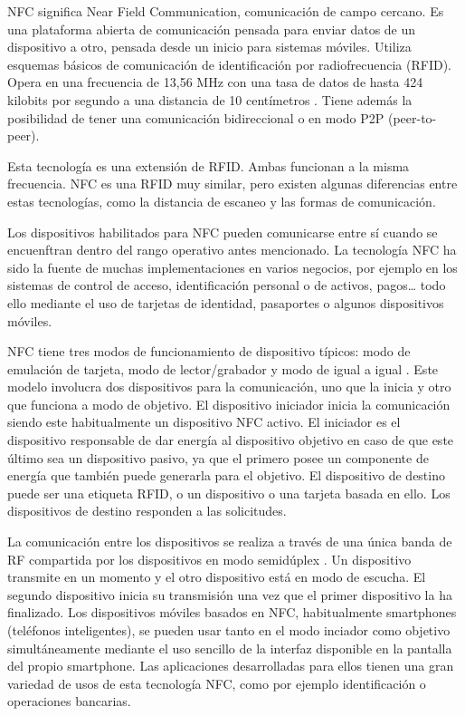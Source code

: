 \documentclass[12pt,a4paper,onecolumn,oneside]{report}
\begin{document}
NFC significa Near Field Communication, comunicación de campo cercano. Es una plataforma abierta de comunicación pensada para enviar datos de un dispositivo a otro, pensada desde un inicio para sistemas móviles. Utiliza esquemas básicos de comunicación de identificación por radiofrecuencia (RFID). Opera en una frecuencia de 13,56 MHz con una tasa de datos de hasta 424 kilobits por segundo a una distancia de 10 centímetros \cite{uno}. Tiene además la posibilidad de tener una comunicación bidireccional o en modo P2P (peer-to-peer).

Esta tecnología es una extensión de RFID. Ambas funcionan a la misma frecuencia. NFC es una RFID muy similar, pero existen algunas diferencias entre estas tecnologías, como la distancia de escaneo y las formas de comunicación. 

Los dispositivos habilitados para NFC pueden comunicarse entre sí cuando se encuenftran dentro del rango operativo antes mencionado. La tecnología NFC ha sido la fuente de muchas implementaciones en varios negocios, por ejemplo en los sistemas de control de acceso, identificación personal o de activos, pagos… todo ello mediante el uso de tarjetas de identidad, pasaportes o algunos dispositivos móviles.

NFC tiene tres modos de funcionamiento de dispositivo típicos: modo de emulación de tarjeta, modo de lector/grabador y modo de igual a igual \cite{tres}. Este modelo involucra dos dispositivos para la comunicación, uno que la inicia y otro que funciona a modo de objetivo. El dispositivo iniciador inicia la comunicación siendo este habitualmente un dispositivo NFC activo. El iniciador es el dispositivo responsable de dar energía al dispositivo objetivo en caso de que este último sea un dispositivo pasivo, ya que el primero posee un componente de energía que también puede generarla para el objetivo. El dispositivo de destino puede ser una etiqueta RFID, o un dispositivo o una tarjeta basada en ello. Los dispositivos de destino responden a las solicitudes.

La comunicación entre los dispositivos se realiza a través de una única banda de RF compartida por los dispositivos en modo semidúplex \cite{cuatro}. Un dispositivo transmite en un momento y el otro dispositivo está en modo de escucha. El segundo dispositivo inicia su transmisión una vez que el primer dispositivo la ha finalizado. Los dispositivos móviles basados en NFC, habitualmente smartphones (teléfonos inteligentes), se pueden usar tanto en el modo inciador como objetivo simultáneamente mediante el uso sencillo de la interfaz disponible en la pantalla del propio smartphone. Las aplicaciones desarrolladas para ellos tienen una gran variedad de usos de esta tecnología NFC, como por ejemplo identificación o operaciones bancarias.
\end{document}
